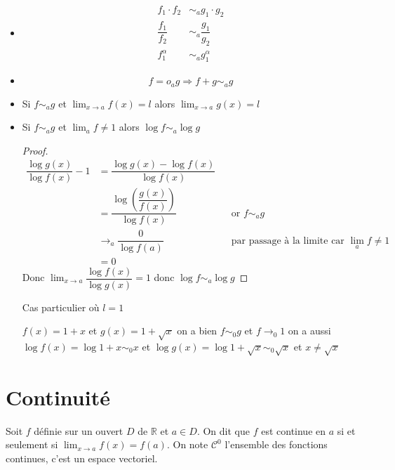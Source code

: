 \documentclass[11pt,colorlinks]{book}
\theoremstyle{mytheoremstyle}
\theoremstyle{mytheoremstyle}
\theoremstyle{mytheoremstyle}
\theoremstyle{mytheoremstyle}
\theoremstyle{mytheoremstyle}
\theoremstyle{mytheoremstyle}
\theoremstyle{mytheoremstyle}
\theoremstyle{mytheoremstyle}
\theoremstyle{myproblemstyle}
\def\mbb#1{\mathbb{#1}}
\def\bR{\mbb{R}}
\renewcommand{\equiv}{\sim}
\begin{document}
    \begin{itemize}
      \item \begin{align*}
      f_1 \cdot f_2 &\equiv_{a} g_1 \cdot g_2 \\ 
      \dfrac{f_1}{f_2} &\equiv_{a} \dfrac{g_1}{g_2} \\
      f_1^\alpha &\equiv_{a} g_1^\alpha
    \end{align*}
    \item \begin{equation}
      f = o_{a} g \Rightarrow f + g \equiv_{a} g 
    \end{equation}
    \item Si $f \equiv_{a} g$ et $\lim_{x \to a} f(x) = l$ alors $\lim_{x \to a} g(x) = l$
    \item \begin{prop}
      Si $f \equiv_a g$ et $\lim_a f \not= 1$ alors $\log f \equiv_a \log g$
      \begin{proof}
        \begin{align*}
          \dfrac{\log g(x)}{\log f(x)} - 1 &= \dfrac{\log g(x) - \log f(x)}{\log f(x)} \\
          &= \dfrac{\log \left(\dfrac{g(x)}{f(x)}\right)}{\log f(x)} && \text{or } f \equiv_a g \\
          &\to_{a} \dfrac{0}{\log f(a)} && \text{par passage à la limite car } \lim_a f \not= 1 \\
          &= 0
        \end{align*}
        Donc $\lim_{x \to a} \dfrac{\log f(x)}{\log g(x)} = 1$ donc $\log f \equiv_a \log g$
      \end{proof}
    \end{prop}
    Cas particulier où $l=1$ 
    \begin{ex}
      $f(x) = 1+x$ et $g(x) = 1 + \sqrt{x}$ on a bien $f \equiv_0 g$ et $f \to_0 1$ 
      on a aussi $\log f(x) = \log 1+x \equiv_0 x$ et $\log g(x) = \log 1+\sqrt{x} \equiv_0 \sqrt{x}$ et $x \not= \sqrt{x}$
    \end{ex}
  \end{itemize}
  \section{Continuité}
  \begin{definition}
    Soit $f$ définie sur un ouvert $D$ de $\bR$ et $a \in D$.  
    On dit que $f$ est continue en $a$ si et seulement si $\lim_{x \to a} f(x) = f(a)$.  
    On note $\mathcal{C}^0$ l'ensemble des fonctions continues, c'est un espace vectoriel.
  \end{definition}
\end{document}

